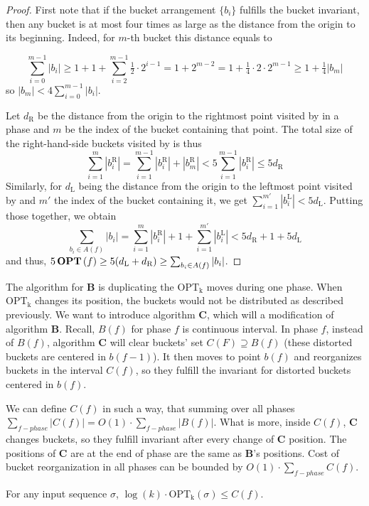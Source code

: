 \begin{proof}
 First note that if the bucket arrangement $\{b_i\}$ fulfills the bucket 
invariant, then any bucket is at most four times as large as the distance from 
the origin to its beginning. Indeed, for $m$-th bucket this distance equals to

\[ \sum_{i=0}^{m-1}|b_i| \geq 1+1+\sum_{i=2}^{m-1}\tfrac12\cdot2^{i-1}
                            = 1+2^{m-2} = 1+\tfrac14\cdot2\cdot2^{m-1}
                         \geq 1+\tfrac14|b_m| \]
so $|b_m|<4\sum_{i=0}^{m-1}|b_i|$.

Let $d_\text{R}$ be the distance from the origin to the rightmost point visited 
by \opt{} in a phase and $m$ be the index of the bucket containing that point. 
The total size of the right-hand-side buckets visited by \opt{} is thus
\[ \sum_{i=1}^m|b_i^\text{R}| = \sum_{i=1}^{m-1}|b_i^\text{R}|+|b_m^\text{R}|
                              < 5\sum_{i=1}^{m-1}|b_i^\text{R}|
                           \leq 5d_\text{R} \]
Similarly, for $d_\text{L}$ being the distance from the origin to the leftmost 
point visited by \opt{} and $m'$ the index of the bucket containing it, we get 
$\sum_{i=1}^{m'}|b_i^\text{L}| < 5d_\text{L}$. Putting those together, we obtain
\[ \sum_{b_i\in A(f)}|b_i| = \sum_{i=1}^{m}|b_i^\text{R}| + 1
                           + \sum_{i=1}^{m'}|b_i^\text{L}|
                           < 5d_\text{R} + 1 + 5d_\text{L} \]
and thus, $5\operatorname{\textbf{OPT}}{}(f)\geq5(d_\text{L}+d_\text{R})\geq\sum_{b_i\in A(f)}|b_i|$.
\end{proof}

The algorithm for \textbf{B} is duplicating the $\mathrm{OPT_k}$ moves during 
one phase. When $\mathrm{OPT_k}$ changes its position, the buckets would not be 
distributed as described previously. We want to introduce algorithm 
\textbf{C}, which will a modification of algorithm \textbf{B}. Recall, $B(f)$ 
for phase $f$ is continuous interval. In phase $f$, instead of $B(f)$, 
algorithm \textbf{C} will clear buckets' set $C(F) \supseteq B(f)$ (these 
distorted buckets are centered in $b(f-1)$). It then moves to point $b(f)$ and 
reorganizes buckets in the interval $C(f)$, so they fulfill the invariant for 
distorted buckets centered in $b(f)$. 
\begin{lemma}
We can define $C(f)$ in such a way, that summing over all phases $\sum_{f - 
phase} |C(f)| = O(1) \cdot \sum_{f - phase} |B(f)|$. What is more, inside 
$C(f)$, \textbf{C} changes buckets, so they fulfill invariant after 
every change of \textbf{C} position. The positions of \textbf{C} are at the end 
of phase are the same as \textbf{B}'s positions. Cost of bucket reorganization 
in all phases can be bounded by $O(1) \cdot \sum_{f-phase} C(f)$.
\end{lemma}
\begin{theorem}
For any input sequence $\sigma$, $ \log(k) \cdot \mathrm{OPT_k}(\sigma) \leq
C(f)$.
\end{theorem}

